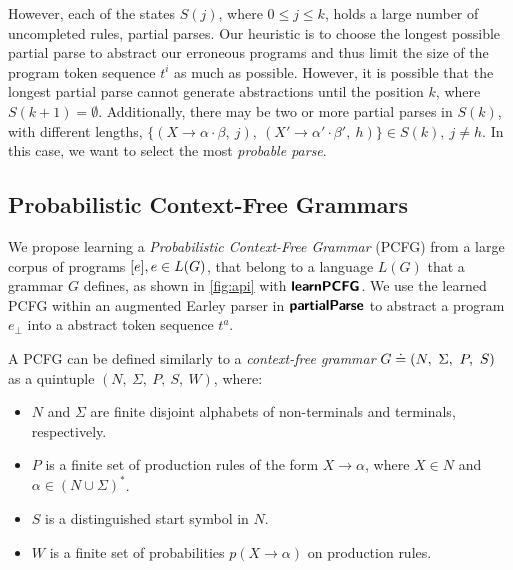 %
However, each of the states $S(j)$, where $0 \leq j \leq k$, holds a large
number of uncompleted rules, \ie partial parses. Our heuristic is to choose the
longest possible partial parse to abstract our erroneous programs and thus limit
the size of the program token sequence $t^i$ as much as possible. However, it is
possible that the longest partial parse cannot generate abstractions until the
position $k$, where $S(k + 1) = \emptyset$. Additionally, there may be two or
more partial parses in $S(k)$, with different lengths, \eg $\{(X \rightarrow
\alpha \cdot \beta,\ j),\ (X' \rightarrow \alpha' \cdot \beta',\ h)\} \in S(k),\
j \neq h$. In this case, we want to select the most \emph{probable parse}.



\subsection{Probabilistic Context-Free Grammars}
\label{sec:prog-abstract:pcfg}
We propose learning a \emph{Probabilistic Context-Free Grammar} (PCFG) from a
large corpus of programs $[e], e \in L(G)$, that belong to a language
$L(G)$ that a grammar $G$ defines, as shown in \autoref{fig:api} with
$\bm{\mathsf{learnPCFG}}$. We use the learned PCFG within an augmented Earley parser in
$\bm{\mathsf{partialParse}}$ to abstract a program $e_{\bot}$ into a abstract token sequence
$t^a$.

%
A PCFG can be defined similarly to a \emph{context-free grammar} $G \doteq (N,\
\Sigma,\ P,\ S)$ as a quintuple $(N,\ \Sigma,\ P,\ S,\ W)$, where:
\begin{itemize}
    \item $N$ and $\Sigma$ are finite disjoint alphabets of non-terminals and
    terminals, respectively.
    \item $P$ is a finite set of production rules of the form $X \rightarrow
    \alpha$, where $X \in N$ and $\alpha \in (N \cup \Sigma)^{\ast}$.
    \item $S$ is a distinguished start symbol in $N$.
    \item $W$ is a finite set of probabilities $p(X \rightarrow \alpha)$ on
    production rules.
\end{itemize}

